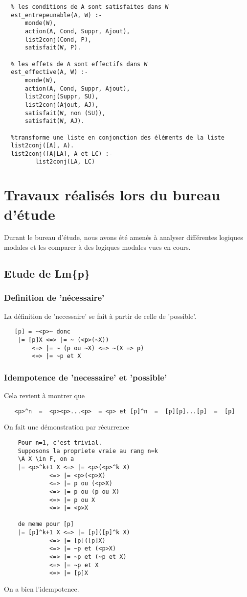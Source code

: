 \documentclass[a4paper,10pt]{article}
\begin{document}
    \begin{lstlisting}
  % les conditions de A sont satisfaites dans W
  est_entrepeunable(A, W) :-
	  monde(W),
	  action(A, Cond, Suppr, Ajout),
	  list2conj(Cond, P),
	  satisfait(W, P).

  % les effets de A sont effectifs dans W
  est_effective(A, W) :-
	  monde(W),
	  action(A, Cond, Suppr, Ajout),
	  list2conj(Suppr, SU),
	  list2conj(Ajout, AJ),
	  satisfait(W, non (SU)),
	  satisfait(W, AJ).

  %transforme une liste en conjonction des éléments de la liste
  list2conj([A], A).
  list2conj([A|LA], A et LC) :-
         list2conj(LA, LC)
   \end{lstlisting}
   
   
 \section{Travaux r\'{e}alis\'{e}s lors du bureau d'\'{e}tude}
 Durant le bureau d'\'{e}tude, nous avons \'{e}t\'{e} amen\'{e}s \`{a} analyser diff\'{e}rentes logiques modales et les comparer \`{a} des logiques modales
 vues en cours.
 
  \subsection{Etude de Lm\{p\} }
  
   \subsubsection{Definition de 'n\'{e}cessaire'}
   La d\'{e}finition de 'necessaire' se fait \`{a} partir de celle de 'possible'.
   \begin{lstlisting}
   [p] = ~<p>~ donc 
	|= [p]X <=> |= ~ (<p>(~X))
		<=> |= ~ (p ou ~X) <=> ~(X => p)
		<=> |= ~p et X
   \end{lstlisting}
   
   \subsubsection{Idempotence de 'necessaire' et 'possible'}
   
   Cela revient \`{a} montrer que  
   \begin{lstlisting}
   <p>^n  =  <p><p>...<p>  = <p> et [p]^n  =  [p][p]...[p]  =  [p]
   \end{lstlisting}
   
   On fait une d\'{e}monstration par r\'{e}currence
   \newpage
   \begin{lstlisting}
	Pour n=1, c'est trivial.
	Supposons la propriete vraie au rang n=k
	\A X \in F, on a
	|= <p>^k+1 X <=> |= <p>(<p>^k X)
		     <=> |= <p>(<p>X)
		     <=> |= p ou (<p>X)
		     <=> |= p ou (p ou X)
		     <=> |= p ou X
		     <=> |= <p>X

	de meme pour [p]
	|= [p]^k+1 X <=> |= [p]([p]^k X)
		     <=> |= [p]([p]X)
		     <=> |= ~p et (<p>X)
		     <=> |= ~p et (~p et X)
		     <=> |= ~p et X
		     <=> |= [p]X
   \end{lstlisting}
   On a bien l'idempotence.
\end{document}
